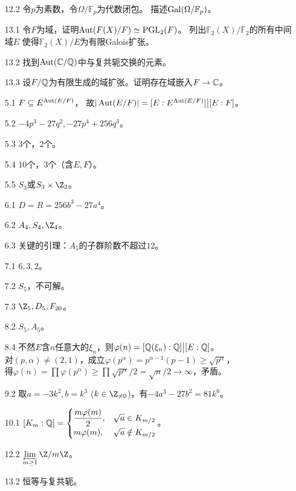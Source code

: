 \begin{itemize}
    \item[12.2] 令$p$为素数，令$\Omega/\mathbb{F}_p$为代数闭包。
    描述$\operatorname{Gal}(\Omega/\mathbb{F}_p)$。

    \item[13.1] 令$F$为域，证明$\operatorname{Aut}(F(X)/F)\simeq\mathrm{PGL}_2(F)$。
    列出$\mathbb{F}_2(X)/\mathbb{F}_2$的所有中间域$E$
    使得$\mathbb{F}_2(X)/E$为有限Galois扩张。

    \item[13.2] 找到$\operatorname{Aut}(\mathbb{C}/\mathbb{Q})$中与复共轭交换的元素。

    \item[13.3] 设$F/\mathbb{Q}$为有限生成的域扩张。证明存在域嵌入$F\to\mathbb{C}$。
\end{itemize}

\begin{proofc}[对个答案]
\begin{itemize}
    \item[5.1] $F\subseteq E^{\operatorname{Aut}(E/F)}$，
    故$|\operatorname{Aut}(E/F)|=[E:E^{\operatorname{Aut}(E/F)}]\big|[E:F]$。
    \item[5.2] $-4p^3-27q^2,-27p^4+256q^3$。
    \item[5.3] $3$个，$2$个。
    \item[5.4] $10$个，$3$个（含$E,F$）。
    \item[5.5] $S_3$或$S_3\times\Z_2$。
    \item[6.1] $D=R=256b^3-27a^4$。
    \item[6.2] $A_4,S_4,\Z_4$。
    \item[6.3] 关键的引理：$A_5$的子群阶数不超过$12$。
    \item[7.1] $6,3,2$。
    \item[7.2] $S_5$，不可解。
    \item[7.3] $\Z_5,D_5,F_{20}$。
    \item[8.2] $S_5,A_5$。
    \item[8.4] 不然$E$含$n$任意大的$\xi_n$，则$\varphi(n)=[\mathbb{Q}(\xi_n):\mathbb{Q}]\big|[E:\mathbb{Q}]$。\\
    对$(p,\alpha)\ne(2,1)$，成立$\varphi(p^\alpha)=p^{\alpha-1}(p-1)\geqslant\sqrt{p^\alpha}$，\\
    得$\varphi(n)=\prod\varphi(p^\alpha)\geqslant\prod\sqrt{p^\alpha}\big/2=\sqrt{n}/2\to\infty$，矛盾。
    \item[9.2] 取$a=-3k^2,b=k^3$ ($k\in\Z_{\ne0}$)，有$-4a^3-27b^2=81k^6$。
    \item[10.1] $[K_m:\mathbb{Q}]=\begin{cases}
        \dfrac{m\varphi(m)}{2},&\sqrt{a}\in K_{m/2}\\
        m\varphi(m),&\sqrt{a}\notin K_{m/2}\end{cases}$。
    \item[12.2] $\lim\limits_{\overleftarrow{m\ge1}}\Z/m\Z$。
    \item[13.2] 恒等与复共轭。\qedhere
\end{itemize}
\end{proofc}


